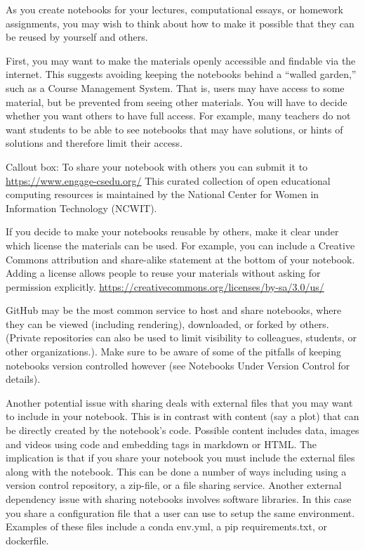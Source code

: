 \documentclass[]{book}
\begin{document}
As you create notebooks for your lectures, computational essays, or
homework assignments, you may wish to think about how to make it
possible that they can be reused by yourself and others.

First, you may want to make the materials openly accessible and findable
via the internet. This suggests avoiding keeping the notebooks behind a
``walled garden,'' such as a Course Management System. That is, users
may have access to some material, but be prevented from seeing other
materials. You will have to decide whether you want others to have full
access. For example, many teachers do not want students to be able to
see notebooks that may have solutions, or hints of solutions and
therefore limit their access.

Callout box: To share your notebook with others you can submit it to
\url{https://www.engage-csedu.org/} This curated collection of open
educational computing resources is maintained by the National Center for
Women in Information Technology (NCWIT).

If you decide to make your notebooks reusable by others, make it clear
under which license the materials can be used. For example, you can
include a Creative Commons attribution and share-alike statement at the
bottom of your notebook. Adding a license allows people to reuse your
materials without asking for permission explicitly.
\url{https://creativecommons.org/licenses/by-sa/3.0/us/}

GitHub may be the most common service to host and share notebooks, where
they can be viewed (including rendering), downloaded, or forked by
others. (Private repositories can also be used to limit visibility to
colleagues, students, or other organizations.). Make sure to be aware of
some of the pitfalls of keeping notebooks version controlled however
(see Notebooks Under Version Control for details).

Another potential issue with sharing deals with external files that you
may want to include in your notebook. This is in contrast with content
(say a plot) that can be directly created by the notebook's code.
Possible content includes data, images and videos using code and
embedding tags in markdown or HTML. The implication is that if you share
your notebook you must include the external files along with the
notebook. This can be done a number of ways including using a version
control repository, a zip-file, or a file sharing service. Another
external dependency issue with sharing notebooks involves software
libraries. In this case you share a configuration file that a user can
use to setup the same environment. Examples of these files include a
conda env.yml, a pip requirements.txt, or dockerfile.
\end{document}
